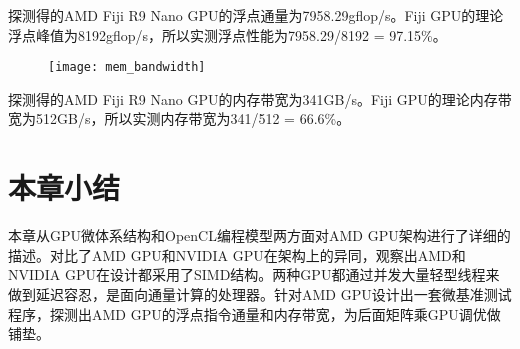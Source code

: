 探测得的AMD Fiji R9 Nano GPU的浮点通量为7958.29gflop/s。Fiji GPU的理论浮点峰值为8192gflop/s，所以实测浮点性能为7958.29/8192 = 97.15\%。

\begin{figure}[htbp]
	\centering
	\texttt{[image: mem\_bandwidth]}
	\label{fig:mem_bandwidth}
\end{figure}

探测得的AMD Fiji R9 Nano GPU的内存带宽为341GB/s。Fiji GPU的理论内存带宽为512GB/s，所以实测内存带宽为341/512 = 66.6\%。

\section{本章小结}
本章从GPU微体系结构和OpenCL编程模型两方面对AMD GPU架构进行了详细的描述。对比了AMD GPU和NVIDIA GPU在架构上的异同，观察出AMD和NVIDIA GPU在设计都采用了SIMD结构。两种GPU都通过并发大量轻型线程来做到延迟容忍，是面向通量计算的处理器。针对AMD GPU设计出一套微基准测试程序，探测出AMD GPU的浮点指令通量和内存带宽，为后面矩阵乘GPU调优做铺垫。


